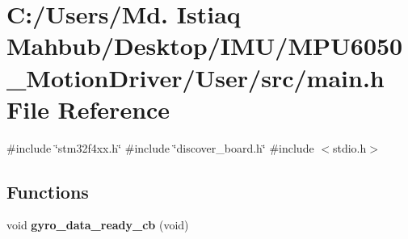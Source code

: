 \section{C\+:/\+Users/\+Md. Istiaq Mahbub/\+Desktop/\+I\+M\+U/\+M\+P\+U6050\+\_\+\+Motion\+Driver/\+User/src/main.h File Reference}
\label{main_8h}
{\ttfamily \#include \char`\"{}stm32f4xx.\+h\char`\"{}}\newline
{\ttfamily \#include \char`\"{}discover\+\_\+board.\+h\char`\"{}}\newline
{\ttfamily \#include $<$stdio.\+h$>$}\newline
\subsection*{Functions}
\begin{DoxyCompactItemize}
\item 
void \textbf{ gyro\+\_\+data\+\_\+ready\+\_\+cb} (void)
\end{DoxyCompactItemize}
